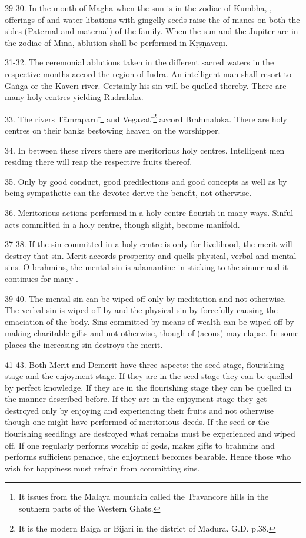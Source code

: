 29-30. In the month of Māgha when the sun is in the zodiac of Kumbha,
, offerings of  and water libations with gingelly seeds
raise the  of manes on both the sides (Paternal and maternal) of
the family. When the sun and the Jupiter are in the zodiac of Mīna, ablution
shall be performed in Kṛṣṇāveṇī.

31-32. The ceremonial ablutions taken in the different sacred waters in
the respective months accord the region of Indra. An intelligent man shall
resort to Gaṅgā or the Kāverī river. Certainly his sin will be quelled thereby.
There are many holy centres yielding Rudraloka.

33. The rivers Tāmraparnī\footnote{It issues from the Malaya mountain called
the Travancore hills in the southern parts of the Western Ghats.} and
Vegavatī\footnote{It is the modern Baiga or Bijari in the district of Madura.
G.D. p.38.} accord Brahmaloka. There are holy centres on their banks bestowing
heaven on the worshipper.

34. In between these rivers there are meritorious holy centres. Intelligent men
residing there will reap the respective fruits thereof.

35. Only by good conduct, good predilections and good concepts as well as by
being sympathetic can the devotee derive the benefit, not otherwise.

36. Meritorious actions performed in a holy centre flourish in many ways. Sinful
acts committed in a holy centre, though slight, become manifold.

37-38. If the sin committed in a holy centre is only for livelihood, the merit
will destroy that sin. Merit accords prosperity and quells physical, verbal and
mental sins. O brahmins, the mental sin is adamantine in sticking to the sinner
and it continues for many .

39-40. The mental sin can be wiped off only by meditation and not otherwise.
The verbal sin is wiped off by  and the physical sin by forcefully
causing the emaciation of the body. Sins committed by means of wealth can be
wiped off by making charitable gifts and not otherwise, though  of
 (aeons) may elapse. In some places the increasing sin destroys
the merit.

41-43. Both Merit and Demerit have three aspects: the seed stage, flourishing
stage and the enjoyment stage. If they are in the seed stage they can be quelled
by perfect knowledge. If they are in the flourishing stage they can be quelled
in the manner described before. If they are in the enjoyment stage they get
destroyed only by enjoying and experiencing their fruits and not otherwise
though one might have performed  of meritorious deeds. If the seed or
the flourishing seedlings are destroyed what remains must be experienced and
wiped off. If one regularly performs worship of gods, makes gifts to brahmins
and performs sufficient penance, the enjoyment becomes bearable. Hence those who
wish for happiness must refrain from committing sins.
